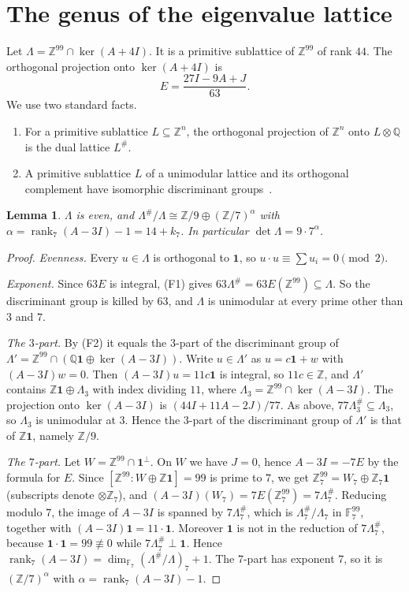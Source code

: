 \documentclass[11pt]{amsart}
\newtheorem{lemma}[theorem]{Lemma}
\theoremstyle{remark}
\newcommand{\Z}{\mathbb{Z}}
\newcommand{\Q}{\mathbb{Q}}
\newcommand{\F}{\mathbb{F}}
\DeclareMathOperator{\rk}{rank}
\begin{document}
\section{The genus of the eigenvalue lattice}\label{sec:genus}
Let $\Lambda=\Z^{99}\cap\ker(A+4I)$. It is a primitive sublattice of $\Z^{99}$ of rank $44$. The orthogonal projection
onto $\ker(A+4I)$ is
\[
E=\frac{27I-9A+J}{63}.
\]
We use two standard facts.
\begin{enumerate}
\item[(F1)] For a primitive sublattice $L\subseteq\Z^n$, the orthogonal projection of $\Z^n$ onto $L\otimes\Q$ is the
dual lattice $L^\#$.
\item[(F2)] A primitive sublattice $L$ of a unimodular lattice and its orthogonal complement have isomorphic discriminant
groups~\cite[Prop.~1.6.1]{Nik}.
\end{enumerate}

\begin{lemma}\label{lem:disc}
$\Lambda$ is even, and $\Lambda^\#/\Lambda\cong\Z/9\oplus(\Z/7)^{\alpha}$ with $\alpha=\rk_7(A-3I)-1=14+k_7$. In
particular $\det\Lambda=9\cdot7^\alpha$.
\end{lemma}
\begin{proof}
\emph{Evenness.} Every $u\in\Lambda$ is orthogonal to $\mathbf 1$, so $u\cdot u\equiv\sum u_i=0\pmod2$.

\emph{Exponent.} Since $63E$ is integral, (F1) gives $63\Lambda^\#=63E(\Z^{99})\subseteq\Lambda$. So the discriminant
group is killed by $63$, and $\Lambda$ is unimodular at every prime other than $3$ and $7$.

\emph{The $3$-part.} By (F2) it equals the $3$-part of the discriminant group of
$\Lambda'=\Z^{99}\cap(\Q\mathbf 1\oplus\ker(A-3I))$. Write $u\in\Lambda'$ as $u=c\mathbf 1+w$ with $(A-3I)w=0$. Then
$(A-3I)u=11c\mathbf 1$ is integral, so $11c\in\Z$, and $\Lambda'$ contains $\Z\mathbf 1\oplus\Lambda_3$ with index
dividing $11$, where $\Lambda_3=\Z^{99}\cap\ker(A-3I)$. The projection onto $\ker(A-3I)$ is $(44I+11A-2J)/77$. As
above, $77\Lambda_3^\#\subseteq\Lambda_3$, so $\Lambda_3$ is unimodular at $3$. Hence the $3$-part of the discriminant
group of $\Lambda'$ is that of $\Z\mathbf 1$, namely $\Z/9$.

\emph{The $7$-part.} Let $W=\Z^{99}\cap\mathbf 1^\perp$. On $W$ we have $J=0$, hence $A-3I=-7E$ by the formula for $E$.
Since $[\Z^{99}:W\oplus\Z\mathbf 1]=99$ is prime to $7$, we get $\Z_7^{99}=W_7\oplus\Z_7\mathbf 1$ (subscripts denote
$\otimes\Z_7$), and $(A-3I)(W_7)=7E(\Z_7^{99})=7\Lambda^\#_7$. Reducing modulo $7$, the image of $A-3I$ is spanned by
$7\Lambda^\#_7$, which is $\Lambda^\#_7/\Lambda_7$ in $\F_7^{99}$, together with $(A-3I)\mathbf 1=11\cdot\mathbf 1$.
Moreover $\mathbf 1$ is not in the reduction of $7\Lambda^\#_7$, because $\mathbf 1\cdot\mathbf 1=99\not\equiv0$ while
$7\Lambda^\#_7\perp\mathbf 1$. Hence $\rk_7(A-3I)=\dim_{\F_7}(\Lambda^\#/\Lambda)_7+1$. The $7$-part has exponent $7$,
so it is $(\Z/7)^\alpha$ with $\alpha=\rk_7(A-3I)-1$.
\end{proof}
\end{document}

